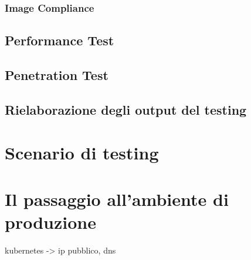 \subsubsection{Image Compliance}
\subsection{Performance Test}
\subsection{Penetration Test}
\subsection{Rielaborazione degli output del testing}

\section{Scenario di testing}

\section{Il passaggio all'ambiente di produzione}
kubernetes -> ip pubblico, dns


